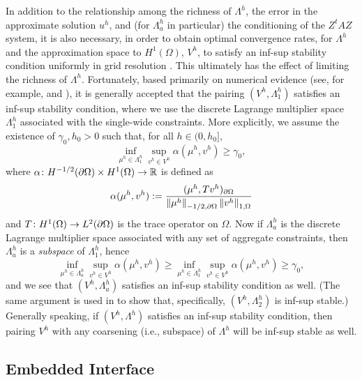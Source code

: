 In addition to the relationship among the richness of $\Lambda^h$, the error in the approximate solution $u^h$, and (for $\Lambda^h_a$ in particular) the conditioning of the $Z^tAZ$ system, it is also necessary, in order to obtain optimal convergence rates, for $\Lambda^h$ and the approximation space to $H^1(\Omega)$, $V^h$, to satisfy an inf-sup stability condition uniformly in grid resolution \cite{Pitkaranta79}. This ultimately has the effect of limiting the richness of $\Lambda^h$. Fortunately, based primarily on numerical evidence (see, for example, \cite{Vaughan06} and \cite{Mourad07}), it is generally accepted that the pairing $(V^h, \Lambda^h_1)$ satisfies an inf-sup stability condition, where we use the discrete Lagrange multiplier space $\Lambda^h_1$ associated with the single-wide constraints. More explicitly, we assume the existence of $\gamma_0, h_0 > 0$ such that, for all $h \in (0, h_0]$,
\begin{equation*}
\inf_{\mu^h \in \Lambda^h_1} \sup_{v^h \in V^h} \alpha(\mu^h, v^h) \geq \gamma_0,
\end{equation*}
where $\alpha \colon H^{-1/2}(\partial\Omega) \times H^1(\Omega) \to \mathbb{R}$ is defined as
\begin{equation*}
\alpha(\mu^h, v^h) := \frac{(\mu^h, T v^h)_{\partial\Omega}}{\left\lVert \mu^h \right\rVert_{-1/2,\partial\Omega} \left\lVert v^h \right\rVert_{1,\Omega}}
\end{equation*}
and $T \colon H^1(\Omega) \to L^2(\partial\Omega)$ is the trace operator on $\Omega$. Now if $\Lambda^h_a$ is the discrete Lagrange multiplier space associated with any set of aggregate constraints, then $\Lambda^h_a$ is a \emph{subspace} of $\Lambda^h_1$, hence
\begin{equation*}
\inf_{\mu^h \in \Lambda^h_a} \sup_{v^h \in V^h} \alpha(\mu^h, v^h) \geq
\inf_{\mu^h \in \Lambda^h_1} \sup_{v^h \in V^h} \alpha(\mu^h, v^h) \geq
\gamma_0,
\end{equation*}
and we see that $(V^h, \Lambda^h_a)$ satisfies an inf-sup stability condition as well. (The same argument is used in \cite{Bedrossian10} to show that, specifically, $(V^h, \Lambda^h_2)$ is inf-sup stable.) Generally speaking, if $(V^h, \Lambda^h)$ satisfies an inf-sup stability condition, then pairing $V^h$ with any coarsening (i.e., subspace) of $\Lambda^h$ will be inf-sup stable as well.

\subsection{Embedded Interface} \label{subsec:ch4.discretization.interface}

